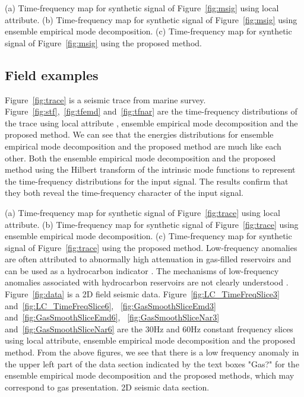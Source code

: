   {(a) Time-frequency map for synthetic signal of Figure~\ref{fig:msig} using local attribute. 
  (b) Time-frequency map for synthetic signal of Figure~\ref{fig:msig} using ensemble empirical mode decomposition. 
  (c) Time-frequency map  for synthetic signal of Figure~\ref{fig:msig} using the proposed method.}

\subsection{Field examples}
Figure~\ref{fig:trace} is a seismic trace from marine survey. 
Figure~\ref{fig:stf},~\ref{fig:tfemd} and~\ref{fig:tfnar} are the time-frequency 
distributions of the trace using local attribute \cite[]{guochang2011}, 
ensemble empirical mode decomposition and the proposed method.
We can see that the energies distributions for ensemble empirical mode decomposition and the proposed method 
are much like each other. Both the ensemble empirical mode decomposition and the proposed method using 
the Hilbert transform of the intrinsic mode functions to represent the time-frequency distributions 
for the input signal. The results confirm that they both reveal the time-frequency
character of the input signal.

  {(a) Time-frequency map for synthetic signal of Figure~\ref{fig:trace} using local attribute. 
  (b) Time-frequency map for synthetic signal of Figure~\ref{fig:trace} using ensemble empirical mode decomposition. 
  (c) Time-frequency map  for synthetic signal of Figure~\ref{fig:trace} using the proposed method.}
Low-frequency anomalies are often attributed to abnormally high attenuation
in gas-filled reservoirs and can be used as a hydrocarbon indicator \cite[]{Castagna2003}.
The mechanisms of low-frequency anomalies associated with hydrocarbon reservoirs 
are not clearly understood \cite[]{Ebrom2004, Kazemeini2009}.
Figure~\ref{fig:data} is a 2D field seismic data. 
Figure~\ref{fig:LC_TimeFreqSlice3} and~\ref{fig:LC_TimeFreqSlice6}, 
~\ref{fig:GasSmoothSliceEmd3} and~\ref{fig:GasSmoothSliceEmd6},
~\ref{fig:GasSmoothSliceNar3} and~\ref{fig:GasSmoothSliceNar6} are
the 30Hz and 60Hz constant frequency slices using local attribute, ensemble empirical mode decomposition and 
the proposed method.
From the above figures, we see that there is a low frequency anomaly 
in the upper left part of the data section indicated by the text boxes
"Gas?" for the ensemble empirical mode decomposition and the proposed methods, 
which may correspond to gas presentation.
{2D seismic data section.}

